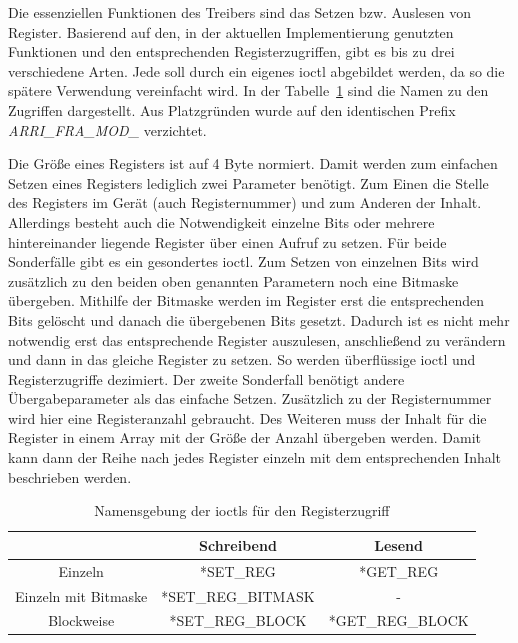 Die essenziellen Funktionen des Treibers sind das Setzen bzw. Auslesen von Register. Basierend auf den, in der aktuellen Implementierung genutzten Funktionen und den entsprechenden Registerzugriffen, gibt es bis zu drei verschiedene Arten. Jede soll durch ein eigenes \ac{ioctl} abgebildet werden, da so die spätere Verwendung vereinfacht wird.  In der Tabelle~\ref{tab:ioctl} sind die Namen zu den Zugriffen dargestellt. Aus Platzgründen wurde auf den identischen Prefix \textit{ARRI\_FRA\_MOD\_} verzichtet.



Die Größe eines Registers ist auf 4 Byte normiert. Damit werden zum einfachen Setzen eines Registers lediglich zwei Parameter benötigt. Zum Einen die Stelle des Registers im Gerät (auch Registernummer) und zum Anderen der Inhalt. 
Allerdings besteht auch die Notwendigkeit einzelne Bits oder mehrere hintereinander liegende Register über einen Aufruf zu setzen. Für beide Sonderfälle gibt es ein gesondertes \ac{ioctl}. Zum Setzen von einzelnen Bits wird zusätzlich zu den beiden oben genannten Parametern noch eine Bitmaske übergeben. Mithilfe der Bitmaske werden im Register erst die entsprechenden Bits gelöscht und danach die übergebenen Bits gesetzt. Dadurch ist es nicht mehr notwendig erst das entsprechende Register auszulesen, anschließend zu verändern und dann in das gleiche Register zu setzen. So werden überflüssige \ac{ioctl} und Registerzugriffe dezimiert.
Der zweite Sonderfall benötigt andere Übergabeparameter als das einfache Setzen. Zusätzlich zu der Registernummer wird hier eine Registeranzahl gebraucht. Des Weiteren muss der Inhalt für die Register in einem Array mit der Größe der Anzahl übergeben werden. Damit kann dann der Reihe nach jedes Register einzeln mit dem entsprechenden Inhalt beschrieben werden.\\


\begin{table}
\centering	
\begin{tabular}[h]{c|c|c}
	& Schreibend & Lesend \\
	\hline
	Einzeln & *SET\_REG & *GET\_REG\\
	\hline
	Einzeln mit Bitmaske & *SET\_REG\_BITMASK & - \\
	\hline
	Blockweise & *SET\_REG\_BLOCK & *GET\_REG\_BLOCK\\
\end{tabular}
\caption{Namensgebung der \ac{ioctl}s für den Registerzugriff} \label{tab:ioctl}
\end{table}


